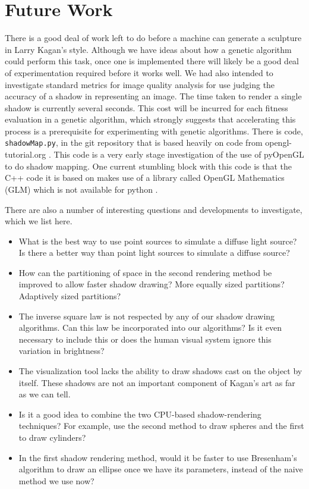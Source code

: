 \documentclass[10pt]{article}
\begin{document}
\section{Future Work}
There is a good deal of work left to do before a machine can generate a sculpture in Larry Kagan's style. Although we have ideas about how a genetic algorithm could perform this task, once one is implemented there will likely be a good deal of experimentation required before it works well. We had also intended to investigate standard metrics for image quality analysis for use judging the accuracy of a shadow in representing an image. The time taken to render a single shadow is currently several seconds. This cost will be incurred for each fitness evaluation in a genetic algorithm, which strongly suggests that accelerating this process is a prerequisite for experimenting with genetic algorithms. There is code, \texttt{shadowMap.py}, in the git repository \cite{gitrepo} that is based heavily on code from opengl-tutorial.org \cite{opengl-tutorial}. This code is a very early stage investigation of the use of pyOpenGL to do shadow mapping. One current stumbling block with this code is that the C++ code it is based on makes use of a library called OpenGL Mathematics (GLM) which is not available for python \cite{GLM}.

There are also a number of interesting questions and developments to investigate, which we list here.
\begin{itemize}
  \item What is the best way to use point sources to simulate a diffuse light source? Is there a better way than point light sources to simulate a diffuse source?

  \item How can the partitioning of space in the second rendering method be improved to allow faster shadow drawing? More equally sized partitions? Adaptively sized partitions?

  \item The inverse square law is not respected by any of our shadow drawing algorithms. Can this law be incorporated into our algorithms? Is it even necessary to include this or does the human visual system ignore this variation in brightness?

  \item The visualization tool lacks the ability to draw shadows cast on the object by itself. These shadows are not an important component of Kagan's art as far as we can tell.

  \item Is it a good idea to combine the two CPU-based shadow-rendering techniques? For example, use the second method to draw spheres and the first to draw cylinders?

  \item In the first shadow rendering method, would it be faster to use Bresenham's algorithm to draw an ellipse once we have its parameters, instead of the naive method we use now?
\end{itemize}
\end{document}
